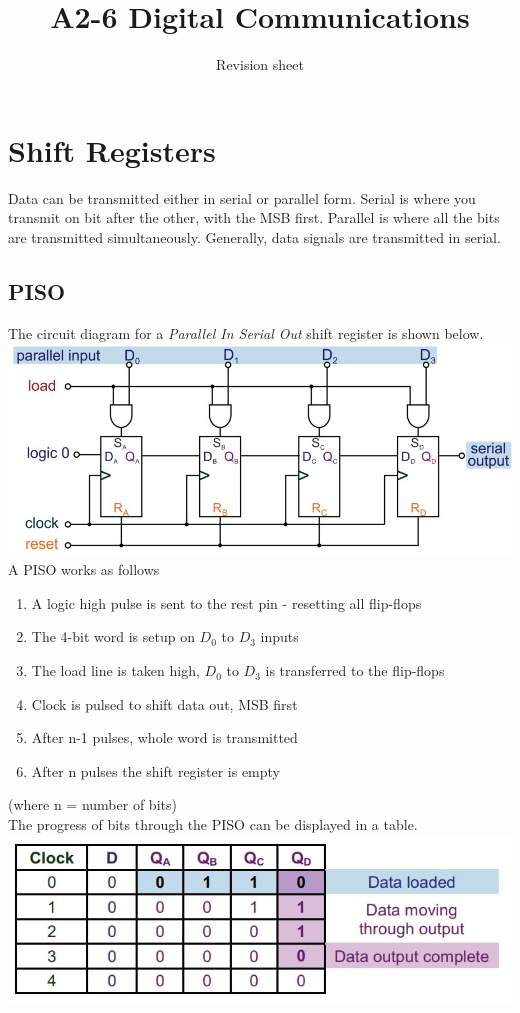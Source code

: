 \documentclass[a4paper,11pt, twocolumn]{article}
\title{A2-6 Digital Communications}
\author{Revision sheet}
\date{}
\begin{document}
\maketitle
\thispagestyle{fancy}


\section{Shift Registers}
Data can be transmitted either in serial or parallel form. Serial is where you transmit on bit after the other, with the MSB first. Parallel is where all the bits are transmitted simultaneously. Generally, data signals are transmitted in serial.
\subsection{PISO}
The circuit diagram for a \textit{Parallel In Serial Out} shift register is shown below.
\includegraphics[width=\linewidth]{piso.jpg}
A PISO works as follows
\begin{enumerate}
    \item A logic high pulse is sent to the rest pin - resetting all flip-flops
    \item The 4-bit word is setup on $D_0$ to $D_3$ inputs
    \item The load line is taken high, $D_0$ to $D_3$ is transferred to the flip-flops
    \item Clock is pulsed to shift data out, MSB first
    \item After n-1 pulses, whole word is transmitted
    \item After n pulses the shift register is empty
\end{enumerate}
(where n = number of bits)\\
The progress of bits through the PISO can be displayed in a table.
\includegraphics[width=\linewidth]{pisoTable.jpg}
\end{document}
